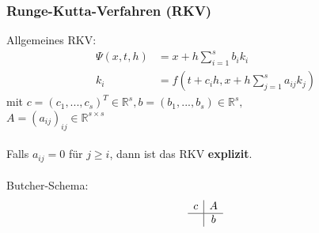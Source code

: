 \documentclass[a4paper,twocolumn,10pt]{article}
\begin{document}
\subsubsection{Runge-Kutta-Verfahren (RKV)}
Allgemeines RKV:
\begin{equation*}
\begin{split}
\Psi(x,t,h)&=x+h\sum\limits_{i=1}^{s}b_ik_i\\
k_i&=f\left(t+c_ih,x+h\sum\limits_{j=1}^{s}a_{ij}k_j\right)
\end{split}
\end{equation*}
mit $c=(c_1,...,c_s)^T\in\mathbb{R}^s, b=(b_1,...,b_s)\in\mathbb{R}^s,$\\
$A=(a_{ij})_{ij}\in\mathbb{R}^{s\times s}$\\\\
Falls $a_{ij}=0$ für $j\geq i$, dann ist das RKV \textbf{explizit}.\\\\
Butcher-Schema:
\begin{equation*}
\begin{array}{c|c}c & A \\ \hline & b\end{array}
\end{equation*}
\end{document}
